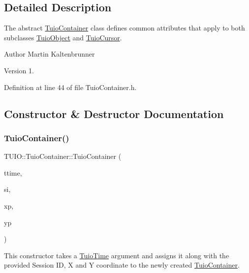 \subsection{Detailed Description}
The abstract \hyperlink{class_t_u_i_o_1_1_tuio_container}{Tuio\+Container} class defines common attributes that apply to both subclasses \hyperlink{class_t_u_i_o_1_1_tuio_object}{Tuio\+Object} and \hyperlink{class_t_u_i_o_1_1_tuio_cursor}{Tuio\+Cursor}.

\begin{DoxyAuthor}{Author}
Martin Kaltenbrunner 
\end{DoxyAuthor}
\begin{DoxyVersion}{Version}
1. 
\end{DoxyVersion}


Definition at line 44 of file Tuio\+Container.\+h.



\subsection{Constructor \& Destructor Documentation}
\mbox{\label{class_t_u_i_o_1_1_tuio_container_a970e6fa8eefc231dccf75d11b68c289d}} 
\subsubsection{\texorpdfstring{Tuio\+Container()}{TuioContainer()}\hspace{0.1cm}{\footnotesize\ttfamily [1/3]}}
{\footnotesize\ttfamily T\+U\+I\+O\+::\+Tuio\+Container\+::\+Tuio\+Container (\begin{DoxyParamCaption}\item[{\hyperlink{class_t_u_i_o_1_1_tuio_time}{Tuio\+Time}}]{ttime,  }\item[{long}]{si,  }\item[{float}]{xp,  }\item[{float}]{yp }\end{DoxyParamCaption})\hspace{0.3cm}{\ttfamily [inline]}}

This constructor takes a \hyperlink{class_t_u_i_o_1_1_tuio_time}{Tuio\+Time} argument and assigns it along with the provided Session ID, X and Y coordinate to the newly created \hyperlink{class_t_u_i_o_1_1_tuio_container}{Tuio\+Container}.



